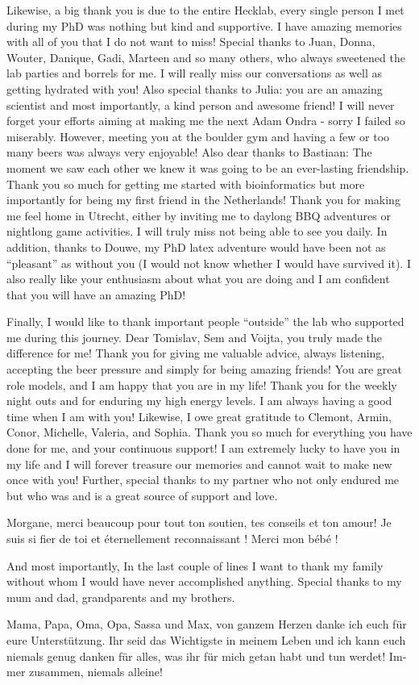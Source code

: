 Likewise, a big thank you is due to the entire Hecklab, every single person I met during my PhD was nothing but kind and supportive. I have amazing memories with all of you that I do not want to miss! Special thanks to Juan, Donna, Wouter, Danique, Gadi, Marteen and so many others, who always sweetened the lab parties and borrels for me. I will really miss our conversations as well as getting hydrated with you! Also special thanks to Julia: you are an amazing scientist and most importantly, a kind person and awesome friend! I will never forget your efforts aiming at making me the next Adam Ondra - sorry I failed so miserably. However, meeting you at the boulder gym and having a few or too many beers was always very enjoyable! Also dear thanks to Bastiaan: The moment we saw each other we knew it was going to be an ever-lasting friendship. Thank you so much for getting me started with bioinformatics but more importantly for being my first friend in the Netherlands! Thank you for making me feel home in Utrecht, either by inviting me to daylong BBQ adventures or nightlong game activities. I will truly miss not being able to see you daily. In addition, thanks to Douwe, my PhD latex adventure would have been not as “pleasant” as without you (I would not know whether I would have survived it). I also really like your enthusiasm about what you are doing and I am confident that you will have an amazing PhD!

Finally, I would like to thank important people “outside” the lab who supported me during this journey. Dear Tomislav, Sem and Voijta, you truly made the difference for me! Thank you for giving me valuable advice, always listening, accepting the beer pressure and simply for being amazing friends! You are great role models, and I am happy that you are in my life! Thank you for the weekly night outs and for enduring my high energy levels. I am always having a good time when I am with you! Likewise, I owe great gratitude to Clemont, Armin, Conor, Michelle, Valeria, and Sophia. Thank you so much for everything you have done for me, and your continuous support! I am extremely lucky to have you in my life and I will forever treasure our memories and cannot wait to make new once with you! Further, special thanks to my partner who not only endured me but who was and is a great source of support and love.
\begin{otherlanguage}{french}
    Morgane, merci beaucoup pour tout ton soutien, tes conseils et ton amour! Je suis si fier de toi et éternellement reconnaissant ! Merci mon bébé !
\end{otherlanguage}
And most importantly, In the last couple of lines I want to thank my family without whom I would have never accomplished anything. Special thanks to my mum and dad, grandparents and my brothers.
\begin{otherlanguage}{german}
    Mama, Papa, Oma, Opa, Sassa und Max, von ganzem Herzen danke ich euch für eure Unterstützung. Ihr seid das Wichtigste in meinem Leben und ich kann euch niemals genug danken für alles, was ihr für mich getan habt und tun werdet! Immer zusammen, niemals alleine!
\end{otherlanguage}
\stopthumb
\blankpage

